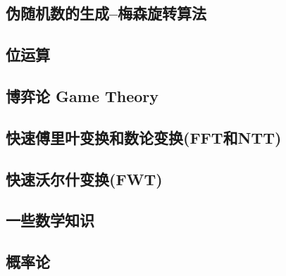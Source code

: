 \subsection{伪随机数的生成--梅森旋转算法}
\subsection{位运算}
\subsection{博弈论 Game Theory}
\subsection{快速傅里叶变换和数论变换(FFT和NTT)}
\subsection{快速沃尔什变换(FWT)}
\subsection{一些数学知识}
\subsection{概率论}




